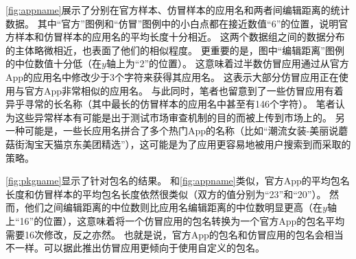 \autoref{fig:appname}展示了分别在官方样本、仿冒样本的应用名和两者间编辑距离的统计数据。
其中``官方''图例和``仿冒''图例中的小白点都在接近数值``6''的位置，说明官方样本和仿冒样本的应用名的平均长度十分相近。
这两个数据组之间的数据分布的主体略微相近，也表面了他们的相似程度。
更重要的是，图中``编辑距离''图例的中位数值十分低（在$y$轴上为``2''的位置）。
这意味着过半数仿冒应用通过从官方App的应用名中修改少于3个字符来获得其应用名。
这表示大部分仿冒应用正在使用与官方App非常相似的应用名。
与此同时，笔者也留意到了一些仿冒应用有着异乎寻常的长名称（其中最长的仿冒样本的应用名中甚至有146个字符）。
笔者认为这些异常样本有可能是出于测试市场审查机制的目的而被上传到市场上的。
另一种可能是，一些长应用名拼合了多个热门App的名称（比如``潮流女装-美丽说蘑菇街淘宝天猫京东美团精选''），这可能是为了应用更容易地被用户搜索到而采取的策略。

\autoref{fig:pkgname}显示了针对包名的结果。
和\autoref{fig:appname}类似，官方App的平均包名长度和仿冒样本的平均包名长度依然很类似（双方的值分别为``23''和``20''）。
然而，他们之间编辑距离的中位数则比应用名编辑距离的中位数明显更高（在$y$轴上``16''的位置），这意味着将一个仿冒应用的包名转换为一个官方App的包名平均需要16次修改，反之亦然。
也就是说，官方App的包名和仿冒应用的包名会相当不一样。可以据此推出仿冒应用更倾向于使用自定义的包名。

